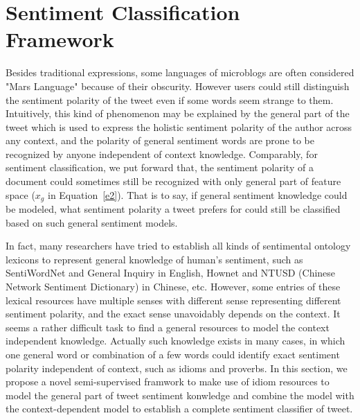 \documentclass{llncs}
\begin{document}
\section{Sentiment Classification Framework}
\label{framework}
Besides traditional expressions, some languages of microblogs are often considered "Mars Language" because of their obscurity.  
However users could still distinguish the sentiment polarity of the tweet even if some words seem strange to them.
Intuitively, this kind of phenomenon may be explained by the general part of the tweet which is used to express the holistic sentiment polarity of the author across any context, and the polarity of general sentiment words are prone to be recognized by anyone independent of context knowledge. 
Comparably, for sentiment classification, we put forward that, the sentiment polarity of a document could sometimes still be recognized with only general part of feature space ($ x_{g} $ in Equation~\ref{e2}). 
That is to say, if general sentiment knowledge could be modeled, what sentiment polarity a tweet prefers for could still be classified based on such general sentiment models.

In fact, many researchers have tried to establish all kinds of sentimental ontology lexicons to represent general knowledge of human’s sentiment, such as SentiWordNet\cite{xsongx:b17} and General Inquiry\cite{xsongx:b18} in English, Hownet\cite{xsongx:b19} and NTUSD (Chinese Network Sentiment Dictionary) in Chinese\cite{xsongx:b20}, etc. 
However, some entries of these lexical resources have multiple senses with different sense representing different sentiment polarity, and the exact sense unavoidably depends on the context.
It seems a rather difficult task to find a general resources to model the context independent knowledge.
Actually such knowledge exists in many cases, in which one general word or combination of a few words could identify exact sentiment polarity independent of context, such as idioms and proverbs. 
In this section, we propose a novel semi-supervised framwork to make use of idiom resources to model the general part of tweet sentiment konwledge and combine the model with 
the context-dependent model to establish a complete sentiment classifier of tweet.
\end{document}
